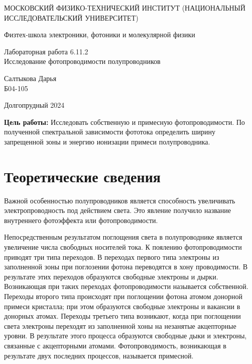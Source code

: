 \documentclass[a4paper,12pt]{article} %
\begin{document}
	
	\begin{titlepage}
	\begin{center}
		{\large МОСКОВСКИЙ ФИЗИКО-ТЕХНИЧЕСКИЙ ИНСТИТУТ (НАЦИОНАЛЬНЫЙ ИССЛЕДОВАТЕЛЬСКИЙ УНИВЕРСИТЕТ)}
	\end{center}
	\begin{center}
		{\large Физтех-школа электроники, фотоники и молекулярной физики}
	\end{center}
	
	
	\vspace{4.5cm}
	{\huge
		\begin{center}
			{Лабораторная работа 6.11.2}\\
			Исследование фотопроводимости полупроводников
		\end{center}
	}
	\vspace{2cm}
	\begin{flushright}
		{\LARGE Салтыкова Дарья \\
			\vspace{0.5cm}
			Б04-105}
	\end{flushright}
	\vspace{8cm}
	\begin{center}
		Долгопрудный 2024
	\end{center}
\end{titlepage}

\noindent \textbf{Цель работы:} Исследовать собственную и примесную фотопроводимости. По полученной спектральной зависимости фототока определить ширину запрещенной зоны и энергию ионизации примеси полупроводника.

\section{Теоретические сведения}

Важной особенностью полупроводников является способность увеличивать электропроводность под действием света. Это явление получило название внутреннего фотоэффекта или фотопроводимости.

	Непосредственным результатом поглощения света в полупроводнике является увеличение числа свободных носителей тока. К поялению фотопроводимости приводят три типа переходов. В переходах первого типа электроны из заполненной зоны при поглозении фотона переводятся в хону проводимости. В результате этих переходов образуются свободные электроны и дырки. Возникающая при таких переходах фотопроводимости называется собственной. Переходы второго типа происходят при поглощении фотона атомом донорной примеси кристалла; при этом образуются свободные электроны и вакансии в донорных атомах. Переходы третьего типа возникают, когда при поглощении света электроны переходят из заполненной хоны на незанятые акцепторные уровни. В результате этого процесса образуются свободные дыки и электроны, связанные с акцепторными атомами. Фотопроводимость, возникающая в результате двух последних процессов, называется примесной.
\end{document}
